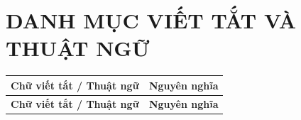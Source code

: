 \documentclass[12pt,a4paper]{article}
\begin{document}
\newpage
\section*{DANH MỤC VIẾT TẮT VÀ THUẬT NGỮ}

\renewcommand{\arraystretch}{1.45}
\setlength{\LTleft}{0pt}
\setlength{\LTright}{0pt}

\begin{longtable}{|p{}|p{}|}
\hline
\textbf{Chữ viết tắt / Thuật ngữ} & \textbf{Nguyên nghĩa} \\
\hline
\endfirsthead

\hline
\textbf{Chữ viết tắt / Thuật ngữ} & \textbf{Nguyên nghĩa} \\
\hline
\endhead


\end{longtable}
\end{document}

